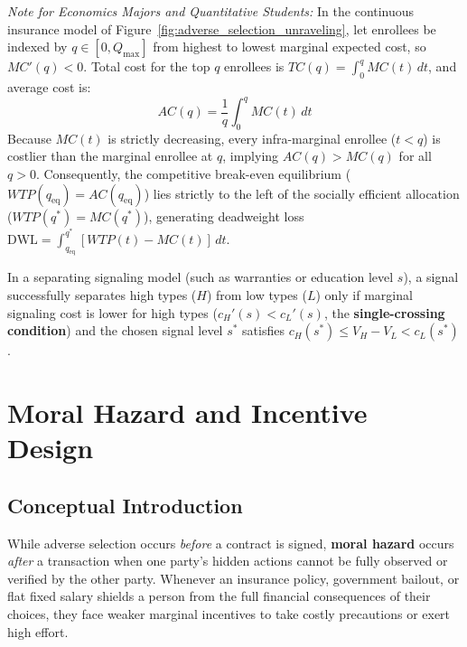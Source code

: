 \documentclass[11pt,letterpaper]{article}
\begin{document}
\begin{tcolorbox}[colback=blue!5!white,colframe=blue!75!black,title=\textbf{Optional Advanced Section: Continuous Adverse Selection and Single-Crossing Signals}]
\small
\emph{Note for Economics Majors and Quantitative Students:}
In the continuous insurance model of Figure~\ref{fig:adverse_selection_unraveling}, let enrollees be indexed by $q \in [0, Q_{\max}]$ from highest to lowest marginal expected cost, so $MC'(q) < 0$. Total cost for the top $q$ enrollees is $TC(q) = \int_0^q MC(t)\,dt$, and average cost is:
\[
AC(q) = \frac{1}{q}\int_0^q MC(t)\,dt
\]
Because $MC(t)$ is strictly decreasing, every infra-marginal enrollee ($t < q$) is costlier than the marginal enrollee at $q$, implying $AC(q) > MC(q)$ for all $q > 0$. Consequently, the competitive break-even equilibrium ($WTP(q_{\text{eq}}) = AC(q_{\text{eq}})$) lies strictly to the left of the socially efficient allocation ($WTP(q^*) = MC(q^*)$), generating deadweight loss $\text{DWL} = \int_{q_{\text{eq}}}^{q^*} [WTP(t) - MC(t)]\,dt$.

In a separating signaling model (such as warranties or education level $s$), a signal successfully separates high types ($H$) from low types ($L$) only if marginal signaling cost is lower for high types ($c_H'(s) < c_L'(s)$, the \textbf{single-crossing condition}) and the chosen signal level $s^*$ satisfies $c_H(s^*) \le V_H - V_L < c_L(s^*)$.
\end{tcolorbox}

\section{Moral Hazard and Incentive Design}

\subsection*{Conceptual Introduction}
While adverse selection occurs \emph{before} a contract is signed, \textbf{moral hazard} occurs \emph{after} a transaction when one party's hidden actions cannot be fully observed or verified by the other party. Whenever an insurance policy, government bailout, or flat fixed salary shields a person from the full financial consequences of their choices, they face weaker marginal incentives to take costly precautions or exert high effort.
\end{document}
